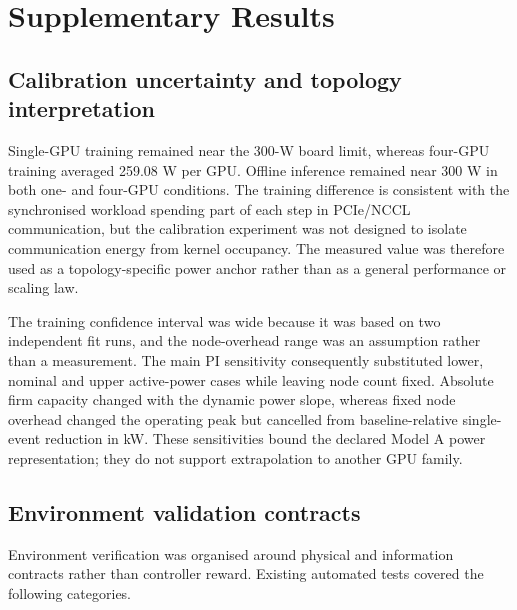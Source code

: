 \documentclass[10pt,a4paper]{article}
\begin{document}
\section{Supplementary Results}

\subsection{Calibration uncertainty and topology interpretation}

Single-GPU training remained near the 300-W board limit, whereas four-GPU training averaged 259.08 W per GPU. Offline inference remained near 300 W in both one- and four-GPU conditions. The training difference is consistent with the synchronised workload spending part of each step in PCIe/NCCL communication, but the calibration experiment was not designed to isolate communication energy from kernel occupancy. The measured value was therefore used as a topology-specific power anchor rather than as a general performance or scaling law.


The training confidence interval was wide because it was based on two independent fit runs, and the node-overhead range was an assumption rather than a measurement. The main PI sensitivity consequently substituted lower, nominal and upper active-power cases while leaving node count fixed. Absolute firm capacity changed with the dynamic power slope, whereas fixed node overhead changed the operating peak but cancelled from baseline-relative single-event reduction in kW. These sensitivities bound the declared Model A power representation; they do not support extrapolation to another GPU family.


\subsection{Environment validation contracts}

Environment verification was organised around physical and information contracts rather than controller reward. Existing automated tests covered the following categories.
\end{document}
